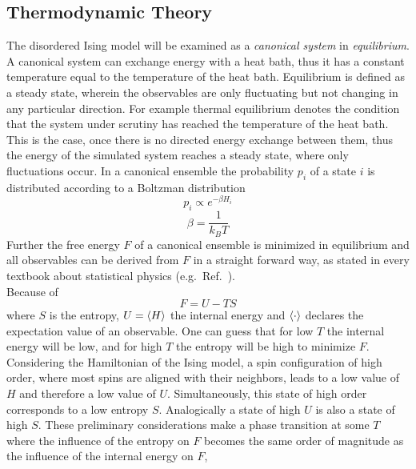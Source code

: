 \subsection{Thermodynamic Theory}
\label{ssec:theory}
    The disordered Ising model will be examined as a \emph{canonical system} in
    \emph{equilibrium}. A canonical system can exchange energy with a
    heat bath, thus it has a constant temperature equal to the temperature of the
    heat bath.
    Equilibrium is defined as a steady state, wherein
    the observables are only fluctuating but not changing in any
    particular direction. For example thermal equilibrium denotes the
    condition that the system under scrutiny has reached the temperature
    of the heat bath. This is the case, once there is no directed energy
    exchange between them, thus the energy of the simulated system reaches
    a steady state, where only fluctuations occur.
    In a canonical ensemble the probability \(p_i\) of a state
    \(i\) is distributed according to a Boltzman distribution
    \begin{equation}
        p_i \propto e^{-\beta H_i}
    \end{equation}
    \begin{equation}
        \beta = \frac{1}{k_B T}
    \end{equation}
    Further the free energy \(F\) of a canonical ensemble is minimized
    in equilibrium and all observables can be derived from \(F\)
    in a straight forward way, as stated in every textbook about
    statistical physics (e.g.\ Ref.\ \cite{nolting2005}).\\
    Because of
    \begin{equation}
        F = U - TS
    \end{equation}
    where \(S\) is the entropy, \(U=\left< H \right>\) the internal energy and
    \(\left< \cdot \right>\) declares the expectation value of an observable.
    One can guess that for low \(T\) the internal energy
    will be low, and for high \(T\) the entropy will be high to minimize
    \(F\).
    Considering the Hamiltonian of the Ising model, a spin configuration
    of high order, where most spins are aligned with their neighbors,
    leads to a low value of \(H\) and therefore a low value of \(U\).
    Simultaneously, this state of high order corresponds to a low entropy \(S\).
    Analogically a state of high \(U\) is also a state of high \(S\).
    These preliminary considerations make a phase transition at some
    \(T\) where the influence of the entropy on \(F\) becomes the same
    order of magnitude as the influence of the internal energy on \(F\),
